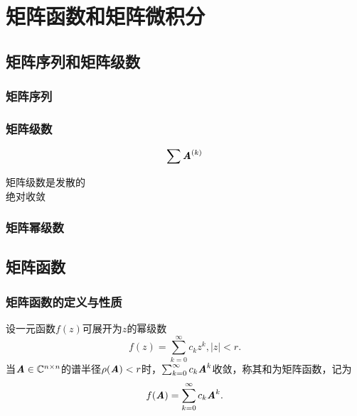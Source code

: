 \chapter{矩阵函数和矩阵微积分}
\label{cha:矩阵函数和矩阵微积分}


\section{矩阵序列和矩阵级数}
\label{sec:矩阵序列和矩阵级数}

\subsection{矩阵序列}
\label{sub:矩阵序列}

\subsection{矩阵级数}
\label{sub:矩阵级数}

\begin{definition}[矩阵级数]
    $$
    \sum \boldsymbol{\mathit{A}}^{(k)}
    $$
\end{definition}

\begin{definition}
    \begin{description}
        \item[矩阵级数是发散的]
        \item[绝对收敛]
    \end{description}
\end{definition}

\subsection{矩阵幂级数}
\label{sub:矩阵幂级数}

\section{矩阵函数}
\label{sec:矩阵函数}

\subsection{矩阵函数的定义与性质}
\label{sub:矩阵函数的定义与性质}

\begin{definition}
    设一元函数$f(z)$可展开为$z$的幂级数
    \[
        f(z) = \sum_{k=0}^{\infty} c_kz^k, |z| < r.
    \]
当$\boldsymbol{\mathit{A}} \in \mathbb{C}^{n \times n}$的谱半径$\rho(\boldsymbol{\mathit{A}}) < r$时，$\sum_{k=0}^{\infty} c_k\boldsymbol{\mathit{A}}^k$收敛，称其和为矩阵函数，记为
    \[
        f(\boldsymbol{\mathit{A}}) = \sum_{k=0}^{\infty} c_k\boldsymbol{\mathit{A}}^k.
    \]
\end{definition}

